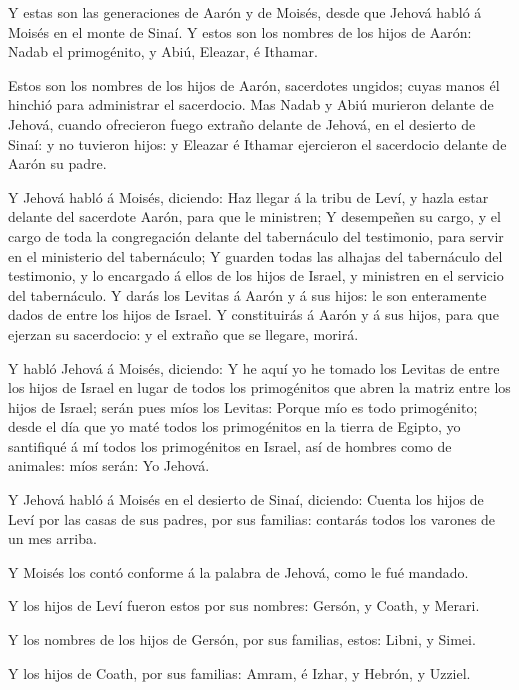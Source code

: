  Y estas son las generaciones de Aarón y de Moisés, desde
que Jehová habló á Moisés en el monte de Sinaí.  Y estos son
los nombres de los hijos de Aarón: Nadab el primogénito, y Abiú,
Eleazar, é Ithamar.

 Estos son los nombres de los hijos de Aarón, sacerdotes
ungidos; cuyas manos él hinchió para administrar el sacerdocio.
 Mas Nadab y Abiú murieron delante de Jehová, cuando
ofrecieron fuego extraño delante de Jehová, en el desierto de Sinaí: y
no tuvieron hijos: y Eleazar é Ithamar ejercieron el sacerdocio delante
de Aarón su padre.

 Y Jehová habló á Moisés, diciendo:  Haz llegar
á la tribu de Leví, y hazla estar delante del sacerdote Aarón, para que
le ministren;  Y desempeñen su cargo, y el cargo de toda la
congregación delante del tabernáculo del testimonio, para servir en el
ministerio del tabernáculo;  Y guarden todas las alhajas del
tabernáculo del testimonio, y lo encargado á ellos de los hijos de
Israel, y ministren en el servicio del tabernáculo.  Y darás
los Levitas á Aarón y á sus hijos: le son enteramente dados de entre los
hijos de Israel.  Y constituirás á Aarón y á sus hijos,
para que ejerzan su sacerdocio: y el extraño que se llegare, morirá.

 Y habló Jehová á Moisés, diciendo:  Y he aquí
yo he tomado los Levitas de entre los hijos de Israel en lugar de todos
los primogénitos que abren la matriz entre los hijos de Israel; serán
pues míos los Levitas:  Porque mío es todo primogénito;
desde el día que yo maté todos los primogénitos en la tierra de Egipto,
yo santifiqué á mí todos los primogénitos en Israel, así de hombres como
de animales: míos serán: Yo Jehová.

 Y Jehová habló á Moisés en el desierto de Sinaí, diciendo:
 Cuenta los hijos de Leví por las casas de sus padres, por
sus familias: contarás todos los varones de un mes arriba.

 Y Moisés los contó conforme á la palabra de Jehová, como
le fué mandado.

 Y los hijos de Leví fueron estos por sus nombres: Gersón,
y Coath, y Merari.

 Y los nombres de los hijos de Gersón, por sus familias,
estos: Libni, y Simei.

 Y los hijos de Coath, por sus familias: Amram, é Izhar, y
Hebrón, y Uzziel.

